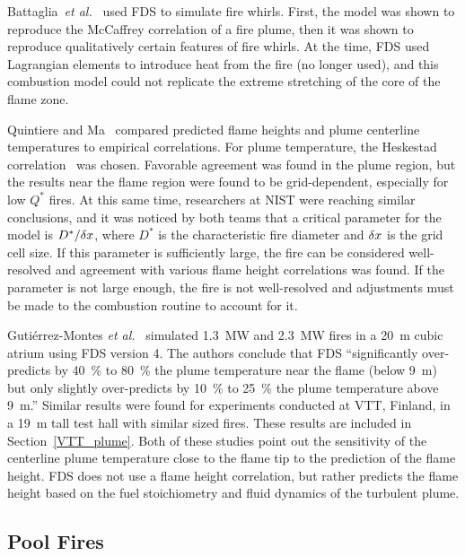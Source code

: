 Battaglia~{\em  et al.}~\cite{Battaglia:1} used  FDS to  simulate fire whirls.   First,  the  model  was  shown to  reproduce  the  McCaffrey
correlation  of  a  fire  plume,   then  it  was  shown  to  reproduce qualitatively certain features  of fire whirls. At the  time, FDS used
Lagrangian elements to introduce heat  from the fire (no longer used), and this  combustion model could not replicate  the extreme stretching of the
core of the flame zone.

Quintiere and Ma~\cite{Ma:2,Ma:3} compared predicted flame heights and plume  centerline temperatures to  empirical correlations.   For plume
temperature,   the  Heskestad   correlation~\cite{SFPE:Heskestad}  was chosen.  Favorable  agreement was found  in the plume region,  but the results
near  the  flame  region  were found  to  be  grid-dependent, especially for  low $Q^*$  fires.  At this  same time,  researchers at NIST were
reaching similar  conclusions, and it  was noticed  by both teams  that a  critical parameter  for the  model is  $D^*/\delta x$, where $D^*$ is the
characteristic fire diameter and $\delta x$  is the grid cell size.  If  this parameter  is  sufficiently  large,  the fire  can  be considered
well-resolved  and  agreement  with various  flame  height correlations was found. If the parameter is not large enough, the fire is not
well-resolved and adjustments  must be made to  the combustion routine to account for it.

Guti\'{e}rrez-Montes {\em et al.}~\cite{Gutierrez:Building_and_Environment} simulated 1.3~MW and 2.3~MW fires in a 20~m cubic atrium using FDS version 4.
The authors conclude that FDS ``significantly
over-predicts by 40~\% to 80~\% the plume temperature near the flame (below 9~m) but only slightly over-predicts by 10~\% to 25~\% the
plume temperature above 9~m.'' Similar results were found for experiments conducted at VTT, Finland, in a 19~m tall test hall with similar sized fires. These results
are included in Section~\ref{VTT_plume}. Both of these studies point out the sensitivity of the centerline plume temperature close to the flame tip to the prediction of the
flame height. FDS does not use a flame height correlation, but rather predicts the flame height based on the fuel stoichiometry and fluid dynamics of the turbulent plume.



\subsection{Pool Fires}


